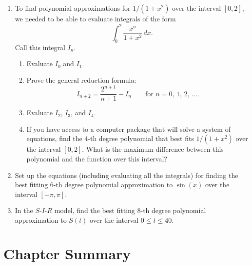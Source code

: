 \begin{enumerate}
\begin{enumerate}
  \item Derive the quadratic least squares approximation to $|x|$ over
$[-1,1]$.

  \item If you have access to a computer package that will solve a system
of equations, find the 10-th degree polynomial that best fits $|x|$
over the interval $[-1,1]$.  What is the maximum difference between
this polynomial and $|x|$ over this interval?


\end{enumerate}
\item To find polynomial approximations for $1/(1+x^2)$ over the
interval $[0,2]$, we needed to be able to evaluate integrals of the
form
\[
\int_0^2 \dfrac{x^n}{1+x^2}\,dx.
\]
Call this integral $I_n$.

  \begin{enumerate}
  \item Evaluate $I_0$ and $I_1$.



  \item Prove the general reduction formula:
\[
I_{n+2} = \dfrac{2^{n+1}}{n+1} -I_n \qquad \text{for $n = 0$, 1, 2, \ldots }.
\]


  \item Evaluate $I_2$, $I_3$, and $I_4$.



  \item If you have access to a computer package that will solve a system
of equations, find the 4-th degree polynomial that best fits $1/(1 +
x^2)$ over the interval $[0, 2]$.  What is the maximum difference
between this polynomial and the function over this interval?


\end{enumerate}
\item Set up the equations (including evaluating all the integrals) for
finding the best fitting 6-th degree polynomial approximation to
$\sin(x)$ over the interval $[-\pi, \pi]$.


\item In the $S$-$I$-$R$ model, find the best fitting 8-th degree
polynomial approximation to $S(t)$ over the interval $0\le t\le 40$.


\end{enumerate}
\section{Chapter Summary}
\label{sec:chapter-summary}

